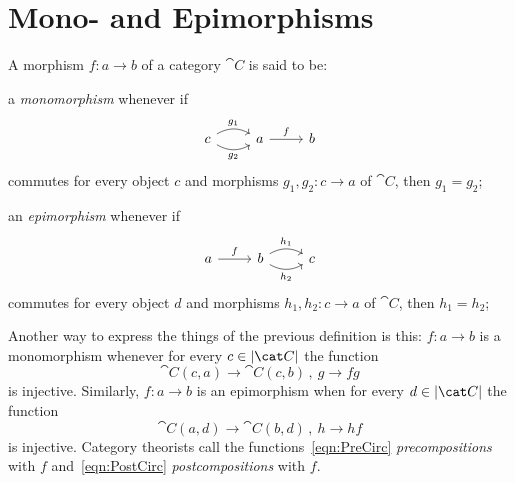 
\section{Mono- and Epimorphisms}


\begin{definition}
  A morphism \(f : a \to b\) of a category \(\cat C\) is said to be:
  \begin{tcbitem}
  \item a {\em monomorphism} whenever if
    \[\begin{tikzcd}
        c \ar["{g_1}", r, bend left] \ar["{g_2}", r, bend right, swap]
        & a \ar["f", r] & b
      \end{tikzcd}\] commutes for every object \(c\) and morphisms
    \(g_1, g_2 : c \to a\) of \(\cat C\), then \(g_1 = g_2\);
  \item an {\em epimorphism} whenever if
    \[\begin{tikzcd}
        a \ar["f", r] & b \ar["{h_1}", r, bend left] \ar["{h_2}", r,
        bend right, swap] & c
      \end{tikzcd}\] commutes for every object \(d\) and morphisms
    \(h_1, h_2 : c \to a\) of \(\cat C\), then \(h_1 = h_2\);
  \end{tcbitem}
\end{definition}

\NotaInterna{\dots{}}

Another way to express the things of the previous definition is this:
\(f : a \to b\) is a monomorphism whenever for every
\(c \in \obj{\cat C}\) the function
\begin{equation}\cat C (c, a) \to \cat C (c, b)\,, \ g \to
  fg \label{eqn:PreCirc}\end{equation}
is injective. Similarly, \(f : a \to b\) is an epimorphism when for every \(d \in \obj{\cat C}\) the function
\begin{equation}\cat C (a, d) \to \cat C (b, d)\,, \ h \to
  hf \label{eqn:PostCirc}\end{equation}
is injective. Category theorists call the functions~\eqref{eqn:PreCirc} {\em precompositions} with \(f\) and~\eqref{eqn:PostCirc} {\em postcompositions} with \(f\).

